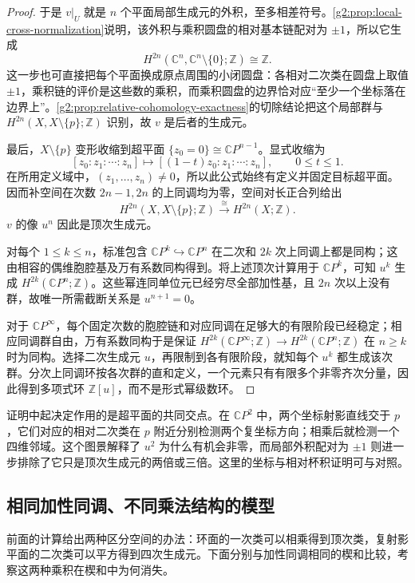 \begin{proof}
	于是 \(v|_U\) 就是 \(n\) 个平面局部生成元的外积，至多相差符号。\cref{g2:prop:local-cross-normalization}说明，该外积与乘积圆盘的相对基本链配对为 \(\pm1\)，所以它生成
	\[
		H^{2n}(\mathbb C^n,\mathbb C^n\setminus\{0\};\mathbb Z)\cong\mathbb Z.
	\]
	这一步也可直接把每个平面换成原点周围的小闭圆盘：各相对二次类在圆盘上取值 \(\pm1\)，乘积链的评价是这些数的乘积，而乘积圆盘的边界恰对应“至少一个坐标落在边界上”。\cref{g2:prop:relative-cohomology-exactness}的切除结论把这个局部群与 \(H^{2n}(X,X\setminus\{p\};\mathbb Z)\) 识别，故 \(v\) 是后者的生成元。

	最后，\(X\setminus\{p\}\) 变形收缩到超平面 \(\{z_0=0\}\cong\mathbb CP^{n-1}\)。显式收缩为
	\[
		[z_0:z_1:\cdots:z_n]\longmapsto[(1-t)z_0:z_1:\cdots:z_n],\qquad 0\leq t\leq1.
	\]
	在所用定义域中，\((z_1,\ldots,z_n)\ne0\)，所以此公式始终有定义并固定目标超平面。因而补空间在次数 \(2n-1,2n\) 的上同调均为零，空间对长正合列给出
	\[
		H^{2n}(X,X\setminus\{p\};\mathbb Z)\xrightarrow{\ \cong\ }H^{2n}(X;\mathbb Z).
	\]
	\(v\) 的像 \(u^n\) 因此是顶次生成元。

	对每个 \(1\leq k\leq n\)，标准包含 \(\mathbb CP^k\hookrightarrow\mathbb CP^n\) 在二次和 \(2k\) 次上同调上都是同构；这由相容的偶维胞腔基及万有系数同构得到。将上述顶次计算用于 \(\mathbb CP^k\)，可知 \(u^k\) 生成 \(H^{2k}(\mathbb CP^n;\mathbb Z)\)。这些幂连同单位元已经穷尽全部加性基，且 \(2n\) 次以上没有群，故唯一所需截断关系是 \(u^{n+1}=0\)。

	对于 \(\mathbb CP^\infty\)，每个固定次数的胞腔链和对应同调在足够大的有限阶段已经稳定；相应同调群自由，万有系数同构于是保证 \(H^{2k}(\mathbb CP^\infty;\mathbb Z)\to H^{2k}(\mathbb CP^n;\mathbb Z)\) 在 \(n\geq k\) 时为同构。选择二次生成元 \(u\)，再限制到各有限阶段，就知每个 \(u^k\) 都生成该次群。分次上同调环按各次群的直和定义，一个元素只有有限多个非零齐次分量，因此得到多项式环 \(\mathbb Z[u]\)，而不是形式幂级数环。
\end{proof}

证明中起决定作用的是超平面的共同交点。在 \(\mathbb CP^2\) 中，两个坐标射影直线交于 \(p\)，它们对应的相对二次类在 \(p\) 附近分别检测两个复坐标方向；相乘后就检测一个四维邻域。这个图景解释了 \(u^2\) 为什么有机会非零，而局部外积配对为 \(\pm1\) 则进一步排除了它只是顶次生成元的两倍或三倍。这里的坐标与相对杯积证明可与\cite[第3.2节，Spaces with Polynomial Cohomology]{Hatcher2002}对照。

\subsection{相同加性同调、不同乘法结构的模型}
\label{g2:subsec:0405:03}
前面的计算给出两种区分空间的办法：环面的一次类可以相乘得到顶次类，复射影平面的二次类可以平方得到四次生成元。下面分别与加性同调相同的楔和比较，考察这两种乘积在楔和中为何消失。

